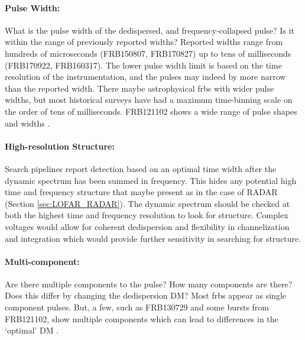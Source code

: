 \documentclass[a4paper,fleqn,usenatbib]{mnras}
\begin{document}
\paragraph{Pulse Width:}

What is the pulse width of the dedispersed, and frequency-collapsed pulse? Is it
within the range of previously reported widths? Reported widths range from
hundreds of microseconds (FRB150807, FRB170827) up to tens of milliseconds
(FRB170922, FRB160317). The lower pulse width limit is based on the time
resolution of the instrumentation, and the pulses may indeed by more narrow than
the reported width. There maybe astrophysical \glspl{frb} with wider pulse
widths, but most historical surveys have had a maximum time-binning scale on the
order of tens of milliseconds. FRB121102 shows a wide range of pulse shapes and
widths \citep{2018Natur.553..182M,atel10675}.

\paragraph{High-resolution Structure:}

Search pipelines report detection based on an optimal time width after the
dynamic spectrum has been summed in frequency. This hides any potential high
time and frequency structure that maybe present as in the case of RADAR (Section
\ref{sec:LOFAR_RADAR}). The dynamic spectrum should be checked at both the
highest time and frequency resolution to look for structure. Complex voltages
would allow for coherent dedispersion and flexibility in channelization and
integration which would provide further sensitivity in searching for structure.

\paragraph{Multi-component:}

Are there multiple components to the pulse? How many components are there? Does
this differ by changing the dedispersion DM? Most \glspl{frb} appear as single
component pulses. But, a few, such as FRB130729 and some bursts from FRB121102,
show multiple components which can lead to differences in the `optimal' DM
\citep{2018Natur.553..182M}.
\end{document}
